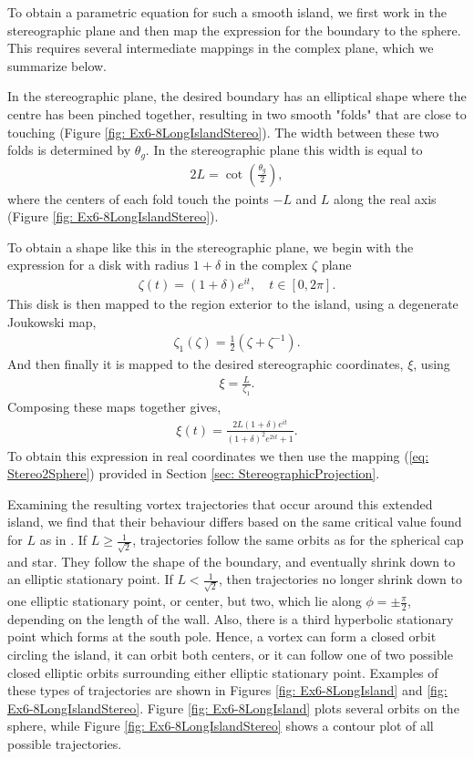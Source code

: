 \documentclass{sfuthesis}
\begin{document}
To obtain a parametric equation for such a smooth island, we first work in the stereographic plane and then map the expression for the boundary to the sphere. This requires several intermediate mappings in the complex plane, which we summarize below. 

In the stereographic plane, the desired boundary has an elliptical shape where the centre has been pinched together, resulting in two smooth "folds" that are close to touching (Figure \ref{fig: Ex6-8LongIslandStereo}). The width between these two folds is determined by $\theta_g$. In the stereographic plane this width is equal to 
\begin{align*}
	2L=\cot \left(\frac{\theta_g}{2}\right),
\end{align*}
where the centers of each fold touch the points $-L$ and $L$ along the real axis (Figure \ref{fig: Ex6-8LongIslandStereo}). 

To obtain a shape like this in the stereographic plane, we begin with the expression for a disk with radius $1+\delta$ in the complex $\zeta$ plane 
\begin{align*}
	\zeta(t)=(1+\delta)e^{it}, \quad t\in[0, 2\pi].
\end{align*}
This disk is then mapped to the region exterior to the island, using a degenerate Joukowski map, 
\begin{align*}
	\zeta_1(\zeta)=\frac{1}{2}(\zeta +{\zeta}^{-1}).
\end{align*}
And then finally it is mapped to the desired stereographic coordinates, $\xi$, using 
\begin{align*}
	\xi=\frac{L}{\zeta_1}.
\end{align*}
Composing these maps together gives, 
\begin{align*}
	\xi(t)=\frac{2L(1+\delta)e^{it}}{{(1+\delta)}^2e^{2it}+1}.
\end{align*}
To obtain this expression in real coordinates we then use the mapping (\ref{eq: Stereo2Sphere}) provided in Section \ref{sec: StereographicProjection}. 

Examining the resulting vortex trajectories that occur around this extended island, we find that their behaviour differs based on the same critical value found for $L$ as in \cite{Crowdy2006}. If $L\geq \frac{1}{\sqrt{2}}$, trajectories follow the same orbits as for the spherical cap and star. They follow the shape of the boundary, and eventually shrink down to an elliptic stationary point. If $L<\frac{1}{\sqrt{2}}$, then trajectories no longer shrink down to one elliptic stationary point, or center, but two, which lie along $\phi=\pm \frac{\pi}{2}$, depending on the length of the wall. Also, there is a third hyperbolic stationary point which forms at the south pole. Hence, a vortex can form a closed orbit circling the island, it can orbit both centers, or it can follow one of two possible closed elliptic orbits surrounding either elliptic stationary point. 
Examples of these types of trajectories are shown in Figures \ref{fig: Ex6-8LongIsland} and \ref{fig: Ex6-8LongIslandStereo}. Figure \ref{fig: Ex6-8LongIsland} plots several orbits on the sphere, while Figure \ref{fig: Ex6-8LongIslandStereo} shows a contour plot of all possible trajectories. 
\end{document}
